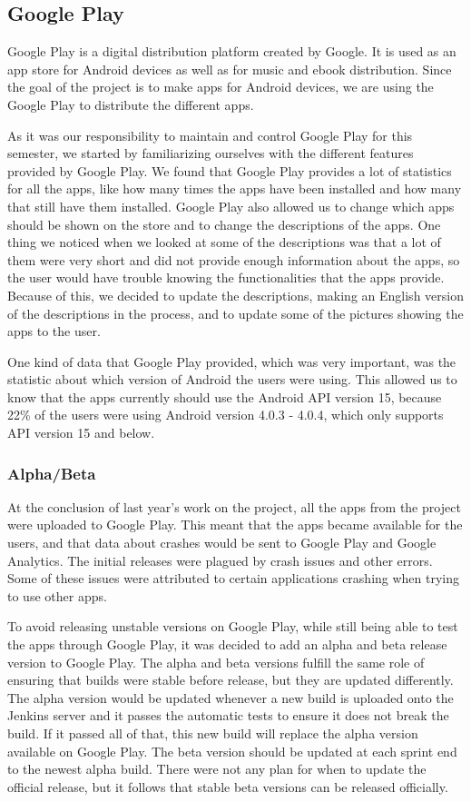 \subsection{Google Play}
Google Play is a digital distribution platform created by Google. It is used as an app store for Android devices as well as for music and ebook distribution. Since the goal of the project is to make apps for Android devices, we are using the Google Play to distribute the different apps. \citep{GooglePlay}

As it was our responsibility to maintain and control Google Play for this semester, we started by familiarizing ourselves with the different features provided by Google Play. We found that Google Play provides a lot of statistics for all the apps, like how many times the apps have been installed and how many that still have them installed. Google Play also allowed us to change which apps should be shown on the store and to change the descriptions of the apps. One thing we noticed when we looked at some of the descriptions was that a lot of them were very short and did not provide enough information about the apps, so the user would have trouble knowing the functionalities that the apps provide. Because of this, we decided to update the descriptions, making an English version of the descriptions in the process, and to update some of the pictures showing the apps to the user.

One kind of data that Google Play provided, which was very important, was the statistic about which version of Android the users were using. This allowed us to know that the apps currently should use the Android API version 15, because 22\% of the users were using Android version 4.0.3 - 4.0.4, which only supports API version 15 and below. \citep{API15}

\subsubsection{Alpha/Beta}
At the conclusion of last year's work on the project, all the apps from the project were uploaded to Google Play. This meant that the apps became available for the users, and that data about crashes would be sent to Google Play and Google Analytics. The initial releases were plagued by crash issues and other errors. Some of these issues were attributed to certain applications crashing when trying to use other apps.

To avoid releasing unstable versions on Google Play, while still being able to test the apps through Google Play, it was decided to add an alpha and beta release version to Google Play. The alpha and beta versions fulfill the same role of ensuring that builds were stable before release, but they are updated differently. The alpha version would be updated whenever a new build is uploaded onto the Jenkins server and it passes the automatic tests to ensure it does not break the build. If it passed all of that, this new build will replace the alpha version available on Google Play. The beta version should be updated at each sprint end to the newest alpha build. There were not any plan for when to update the official release, but it follows that stable beta versions can be released officially.

